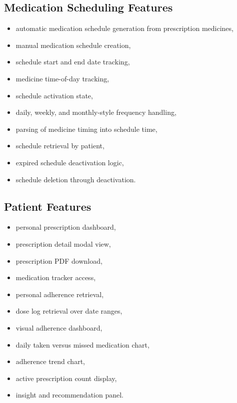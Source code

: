 \documentclass[12pt,a4paper]{article}
\begin{document}
\subsection{Medication Scheduling Features}
\begin{itemize}[leftmargin=*]
  \item automatic medication schedule generation from prescription medicines,
  \item manual medication schedule creation,
  \item schedule start and end date tracking,
  \item medicine time-of-day tracking,
  \item schedule activation state,
  \item daily, weekly, and monthly-style frequency handling,
  \item parsing of medicine timing into schedule time,
  \item schedule retrieval by patient,
  \item expired schedule deactivation logic,
  \item schedule deletion through deactivation.
\end{itemize}

\subsection{Patient Features}
\begin{itemize}[leftmargin=*]
  \item personal prescription dashboard,
  \item prescription detail modal view,
  \item prescription PDF download,
  \item medication tracker access,
  \item personal adherence retrieval,
  \item dose log retrieval over date ranges,
  \item visual adherence dashboard,
  \item daily taken versus missed medication chart,
  \item adherence trend chart,
  \item active prescription count display,
  \item insight and recommendation panel.
\end{itemize}
\end{document}
